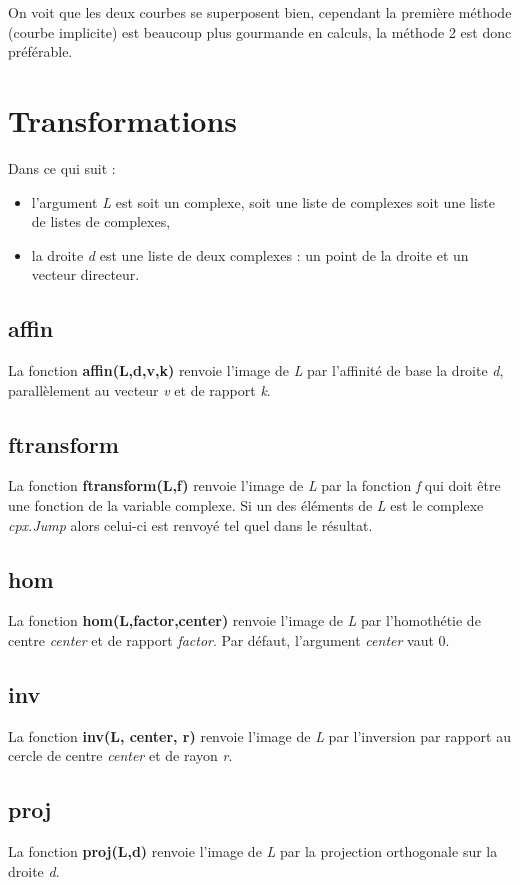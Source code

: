 On voit que les deux courbes se superposent bien, cependant la première méthode (courbe implicite) est beaucoup plus gourmande en calculs, la méthode 2 est donc préférable.


\section{Transformations}
Dans ce qui suit :
\begin{itemize}
    \item l'argument \emph{L} est soit un complexe, soit une liste de complexes soit une liste de listes de complexes,
    \item la droite \emph{d} est une liste de deux complexes : un point de la droite et un vecteur directeur.
  \end{itemize}
  
\subsection{affin}
La fonction \textbf{affin(L,d,v,k)} renvoie l'image de \emph{L} par l'affinité de base la droite \emph{d}, parallèlement au vecteur \emph{v} et de rapport \emph{k}.

\subsection{ftransform}
La fonction \textbf{ftransform(L,f)} renvoie l'image de \emph{L} par la fonction \emph{f} qui doit être une fonction de la variable complexe. Si un des éléments de \emph{L} est le complexe \emph{cpx.Jump} alors celui-ci est renvoyé tel quel dans le résultat.

\subsection{hom}
La fonction \textbf{hom(L,factor,center)} renvoie l'image de \emph{L} par l'homothétie de centre \emph{center} et de rapport \emph{factor}. Par défaut, l'argument \emph{center} vaut 0.

\subsection{inv}
La fonction \textbf{inv(L, center, r)} renvoie l'image de \emph{L} par l'inversion par rapport au cercle de centre \emph{center} et de rayon \emph{r}.

\subsection{proj}
La fonction \textbf{proj(L,d)} renvoie l'image de \emph{L} par la projection orthogonale sur la droite \emph{d}.

